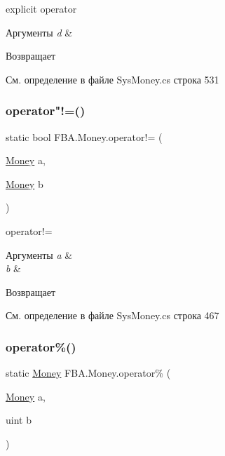 explicit operator 


\begin{DoxyParams}{Аргументы}
{\em d} & \\
\hline
\end{DoxyParams}
\begin{DoxyReturn}{Возвращает}

\end{DoxyReturn}


См. определение в файле Sys\+Money.\+cs строка 531

\mbox{\label{struct_f_b_a_1_1_money_a14f2d302898b1e0111ec2ad626721274}} 
\subsubsection{\texorpdfstring{operator"!=()}{operator!=()}}
{\footnotesize\ttfamily static bool F\+B\+A.\+Money.\+operator!= (\begin{DoxyParamCaption}\item[{\mbox{\hyperlink{struct_f_b_a_1_1_money}{Money}}}]{a,  }\item[{\mbox{\hyperlink{struct_f_b_a_1_1_money}{Money}}}]{b }\end{DoxyParamCaption})\hspace{0.3cm}{\ttfamily [static]}}



operator!= 


\begin{DoxyParams}{Аргументы}
{\em a} & \\
\hline
{\em b} & \\
\hline
\end{DoxyParams}
\begin{DoxyReturn}{Возвращает}

\end{DoxyReturn}


См. определение в файле Sys\+Money.\+cs строка 467

\mbox{\label{struct_f_b_a_1_1_money_aa4a30ed94810edff28d26255696b2fbc}} 
\subsubsection{\texorpdfstring{operator\%()}{operator\%()}}
{\footnotesize\ttfamily static \mbox{\hyperlink{struct_f_b_a_1_1_money}{Money}} F\+B\+A.\+Money.\+operator\% (\begin{DoxyParamCaption}\item[{\mbox{\hyperlink{struct_f_b_a_1_1_money}{Money}}}]{a,  }\item[{uint}]{b }\end{DoxyParamCaption})\hspace{0.3cm}{\ttfamily [static]}}



